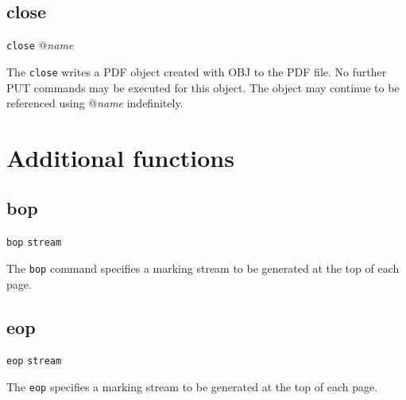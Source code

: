 \subsection{close}

{\tt close} @{\it name}

The {\tt close} writes a PDF object created with OBJ to the PDF file.
No further PUT commands may be executed for this object.
The object may continue to be referenced using @{\it name}
indefinitely.

\section{Additional functions}
\subsection{bop}

{\tt bop} {\tt stream}

The {\tt bop} command specifies a marking stream to be generated at the top of each page.

\subsection{eop}

{\tt eop} {\tt stream}

The {\tt eop} specifies a marking stream to be generated at the top of each page.

\bye
